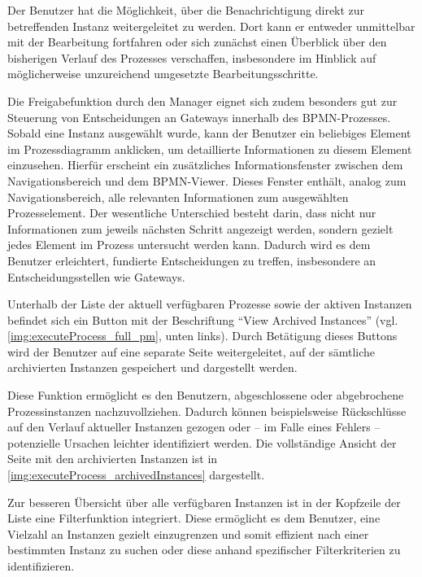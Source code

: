 
Der Benutzer hat die Möglichkeit, über die Benachrichtigung direkt zur betreffenden Instanz weitergeleitet zu werden. Dort kann er entweder unmittelbar mit der Bearbeitung fortfahren oder sich zunächst einen Überblick über den bisherigen Verlauf des Prozesses verschaffen, insbesondere im Hinblick auf möglicherweise unzureichend umgesetzte Bearbeitungsschritte.

Die Freigabefunktion durch den Manager eignet sich zudem besonders gut zur Steuerung von Entscheidungen an Gateways innerhalb des BPMN-Prozesses. Sobald eine Instanz ausgewählt wurde, kann der Benutzer ein beliebiges Element im Prozessdiagramm anklicken, um detaillierte Informationen zu diesem Element einzusehen. Hierfür erscheint ein zusätzliches Informationsfenster zwischen dem Navigationsbereich und dem BPMN-Viewer. Dieses Fenster enthält, analog zum Navigationsbereich, alle relevanten Informationen zum ausgewählten Prozesselement. Der wesentliche Unterschied besteht darin, dass nicht nur Informationen zum jeweils nächsten Schritt angezeigt werden, sondern gezielt jedes Element im Prozess untersucht werden kann. Dadurch wird es dem Benutzer erleichtert, fundierte Entscheidungen zu treffen, insbesondere an Entscheidungsstellen wie Gateways.



Unterhalb der Liste der aktuell verfügbaren Prozesse sowie der aktiven Instanzen befindet sich ein Button mit der Beschriftung \enquote{View Archived Instances} (vgl. \autoref{img:executeProcess_full_pm}, unten links). Durch Betätigung dieses Buttons wird der Benutzer auf eine separate Seite weitergeleitet, auf der sämtliche archivierten Instanzen gespeichert und dargestellt werden. 

Diese Funktion ermöglicht es den Benutzern, abgeschlossene oder abgebrochene Prozessinstanzen nachzuvollziehen. Dadurch können beispielsweise Rückschlüsse auf den Verlauf aktueller Instanzen gezogen oder – im Falle eines Fehlers – potenzielle Ursachen leichter identifiziert werden. Die vollständige Ansicht der Seite mit den archivierten Instanzen ist in \autoref{img:executeProcess_archivedInstances} dargestellt.



Zur besseren Übersicht über alle verfügbaren Instanzen ist in der Kopfzeile der Liste eine Filterfunktion integriert. Diese ermöglicht es dem Benutzer, eine Vielzahl an Instanzen gezielt einzugrenzen und somit effizient nach einer bestimmten Instanz zu suchen oder diese anhand spezifischer Filterkriterien zu identifizieren.

